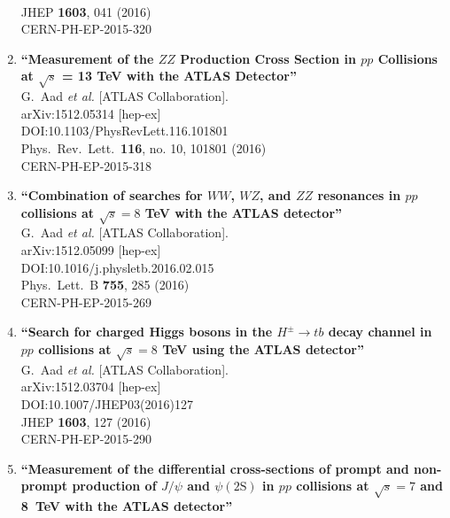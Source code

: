 \documentclass{article}
\begin{document}
\begin{enumerate}
  \\{}JHEP {\bf 1603}, 041 (2016)
  \\{}CERN-PH-EP-2015-320
\item%
{\bf ``Measurement of the $ZZ$ Production Cross Section in $pp$ Collisions at $\sqrt{s}$ = 13 TeV with the ATLAS Detector''}
  \\{}G.~Aad {\it et al.} [ATLAS Collaboration].
  \\{}arXiv:1512.05314 [hep-ex]
  \\{}DOI:10.1103/PhysRevLett.116.101801
  \\{}Phys.\ Rev.\ Lett.\  {\bf 116}, no. 10, 101801 (2016)
  \\{}CERN-PH-EP-2015-318
\item%
{\bf ``Combination of searches for $WW$, $WZ$, and $ZZ$ resonances in $pp$ collisions at $\sqrt{s} = 8$ TeV with the ATLAS detector''}
  \\{}G.~Aad {\it et al.} [ATLAS Collaboration].
  \\{}arXiv:1512.05099 [hep-ex]
  \\{}DOI:10.1016/j.physletb.2016.02.015
  \\{}Phys.\ Lett.\ B {\bf 755}, 285 (2016)
  \\{}CERN-PH-EP-2015-269
\item%
{\bf ``Search for charged Higgs bosons in the $H^{\pm} \rightarrow tb$ decay channel in $pp$ collisions at $\sqrt{s}=8 $ TeV using the ATLAS detector''}
  \\{}G.~Aad {\it et al.} [ATLAS Collaboration].
  \\{}arXiv:1512.03704 [hep-ex]
  \\{}DOI:10.1007/JHEP03(2016)127
  \\{}JHEP {\bf 1603}, 127 (2016)
  \\{}CERN-PH-EP-2015-290
\item%
{\bf ``Measurement of the differential cross-sections of prompt and non-prompt production of $J/\psi $ and $\psi (2\mathrm {S})$ in $pp$ collisions at $\sqrt{s} = 7$ and 8 TeV with the ATLAS detector''}

\end{enumerate}
\end{document}
